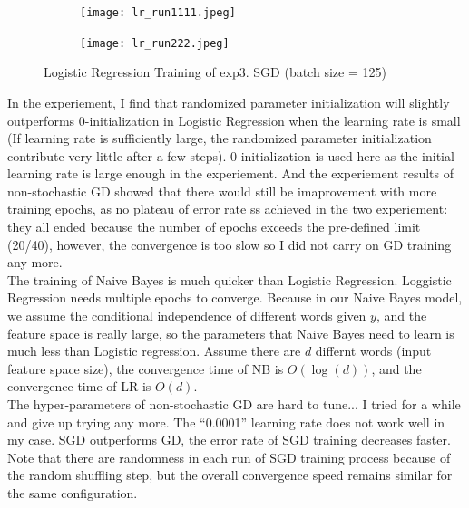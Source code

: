 \documentclass{article}
\theoremstyle{definition}
\theoremstyle{definition}
\theoremstyle{remark}
\begin{document}
\begin{addmargin}[3em]{2em}
  \begin{figure}[!tbp]
    \centering%
    \begin{subfigure}[b]{\columnwidth}
      \centering
      \texttt{[image: lr\_run1111.jpeg]}
    \end{subfigure}

    \vspace{2em}

    \begin{subfigure}[b]{\columnwidth}
      \centering
      \texttt{[image: lr\_run222.jpeg]}
    \end{subfigure}
    \caption{Logistic Regression Training of exp3. SGD (batch size = 125)}
    \label{pic:lr}
  \end{figure}

  In the experiement, I find that randomized parameter initialization will slightly outperforms 0-initialization in Logistic Regression when the learning rate is small (If learning rate is sufficiently large, the randomized parameter initialization contribute very little after a few steps). 0-initialization is used here as the initial learning rate is large enough in the experiement. And the experiement results of non-stochastic GD showed that there would still be imaprovement with more training epochs, as no plateau of error rate ss achieved in the two experiement: they all ended because the number of epochs exceeds the pre-defined limit (20/40), however, the convergence is too slow so I did not carry on GD training any more.\\

  The training of Naive Bayes is much quicker than Logistic Regression. Loggistic Regression needs multiple epochs to converge. Because in our Naive Bayes model, we assume the conditional independence of different words given $y$, and the feature space is really large, so the parameters that Naive Bayes need to learn is much less than Logistic regression. Assume there are $d$ differnt words (input feature space size), the convergence time of NB is $O(\log(d))$, and the convergence time of LR is $O(d)$.\\

  The hyper-parameters of non-stochastic GD are hard to tune... I tried for a while and give up trying any more. The ``0.0001'' learning rate does not work well in my case. SGD outperforms GD, the error rate of SGD training decreases faster. Note that there are randomness in each run of SGD training process because of the random shuffling step, but the overall convergence speed remains similar for the same configuration.\\


\end{addmargin}
\end{document}
